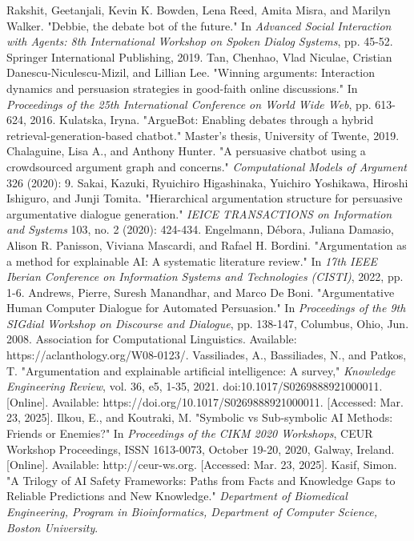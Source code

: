 \documentclass[conference]{IEEEtran}
\begin{document}
\begin{thebibliography}{00}
 Rakshit, Geetanjali, Kevin K. Bowden, Lena Reed, Amita Misra, and Marilyn Walker. "Debbie, the debate bot of the future." In \textit{Advanced Social Interaction with Agents: 8th International Workshop on Spoken Dialog Systems}, pp. 45-52. Springer International Publishing, 2019.
 Tan, Chenhao, Vlad Niculae, Cristian Danescu-Niculescu-Mizil, and Lillian Lee. "Winning arguments: Interaction dynamics and persuasion strategies in good-faith online discussions." In \textit{Proceedings of the 25th International Conference on World Wide Web}, pp. 613-624, 2016.
 Kulatska, Iryna. "ArgueBot: Enabling debates through a hybrid retrieval-generation-based chatbot." Master's thesis, University of Twente, 2019.
 Chalaguine, Lisa A., and Anthony Hunter. "A persuasive chatbot using a crowdsourced argument graph and concerns." \textit{Computational Models of Argument} 326 (2020): 9.
 Sakai, Kazuki, Ryuichiro Higashinaka, Yuichiro Yoshikawa, Hiroshi Ishiguro, and Junji Tomita. "Hierarchical argumentation structure for persuasive argumentative dialogue generation." \textit{IEICE TRANSACTIONS on Information and Systems} 103, no. 2 (2020): 424-434.
 Engelmann, Débora, Juliana Damasio, Alison R. Panisson, Viviana Mascardi, and Rafael H. Bordini. "Argumentation as a method for explainable AI: A systematic literature review." In \textit{17th IEEE Iberian Conference on Information Systems and Technologies (CISTI)}, 2022, pp. 1-6.
 Andrews, Pierre, Suresh Manandhar, and Marco De Boni. "Argumentative Human Computer Dialogue for Automated Persuasion." In \textit{Proceedings of the 9th SIGdial Workshop on Discourse and Dialogue}, pp. 138-147, Columbus, Ohio, Jun. 2008. Association for Computational Linguistics. Available: https://aclanthology.org/W08-0123/.
 Vassiliades, A., Bassiliades, N., and Patkos, T. "Argumentation and explainable artificial intelligence: A survey," \textit{Knowledge Engineering Review}, vol. 36, e5, 1-35, 2021. doi:10.1017/S0269888921000011. [Online]. Available: https://doi.org/10.1017/S0269888921000011. [Accessed: Mar. 23, 2025].
 Ilkou, E., and Koutraki, M. "Symbolic vs Sub-symbolic AI Methods: Friends or Enemies?" In \textit{Proceedings of the CIKM 2020 Workshops}, CEUR Workshop Proceedings, ISSN 1613-0073, October 19-20, 2020, Galway, Ireland. [Online]. Available: http://ceur-ws.org. [Accessed: Mar. 23, 2025].
 Kasif, Simon. "A Trilogy of AI Safety Frameworks: Paths from Facts and Knowledge Gaps to Reliable Predictions and New Knowledge." \textit{Department of Biomedical Engineering, Program in Bioinformatics, Department of Computer Science, Boston University}.
\end{thebibliography}
\end{document}
